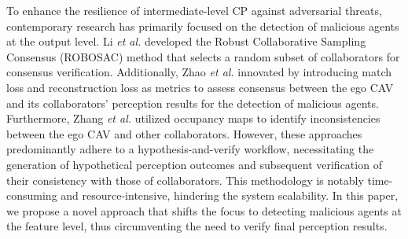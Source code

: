 To enhance the resilience of intermediate-level CP against adversarial threats, contemporary research has primarily focused on the detection of malicious agents at the output level. Li \textit{et al.} \citep{liUsAdversariallyRobust2023} developed the Robust Collaborative Sampling Consensus (ROBOSAC) method that selects a random subset of collaborators for consensus verification. Additionally, Zhao \textit{et al.} \citep{zhaoMaliciousAgentDetection2024} innovated by introducing match loss and reconstruction loss as metrics to assess consensus between the ego CAV and its collaborators' perception results for the detection of malicious agents. Furthermore, Zhang \textit{et al.} \citep{zhangDataFabricationCollaborative2023} utilized occupancy maps to identify inconsistencies between the ego CAV and other collaborators.
However, these approaches predominantly adhere to a hypothesis-and-verify workflow, necessitating the generation of hypothetical perception outcomes and subsequent verification of their consistency with those of collaborators. This methodology is notably time-consuming and resource-intensive, hindering the system scalability. In this paper, we propose a novel approach that shifts the focus to detecting malicious agents at the feature level, thus circumventing the need to verify final perception results.



